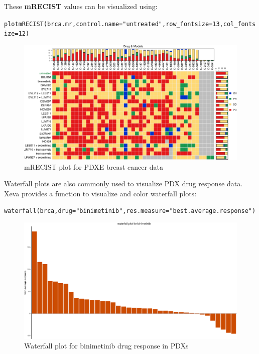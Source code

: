 \documentclass{article}\usepackage[]{graphicx}\usepackage[usenames,dvipsnames]{color}
\makeatletter
\def\maxwidth{ %
  \ifdim\Gin@nat@width>\linewidth
    \linewidth
  \else
    \Gin@nat@width
  \fi
}
\newcommand{\hlnum}[1]{\textcolor[rgb]{0.816,0.125,0.439}{#1}}%
\newcommand{\hlstr}[1]{\textcolor[rgb]{0.251,0.627,0.251}{#1}}%
\newcommand{\hlstd}[1]{\textcolor[rgb]{0.251,0.251,0.251}{#1}}%
\newcommand{\hlkwc}[1]{\textcolor[rgb]{0.251,0.251,0.251}{#1}}%
\newcommand{\hlkwd}[1]{\textcolor[rgb]{0.878,0.439,0.125}{#1}}%
\newenvironment{knitrout}{}{} %
\makeatother
\begin{document}
These \textbf{mRECIST} values can be visualized using:
\begin{knitrout}
\color{fgcolor}\begin{kframe}
\begin{alltt}
\hlkwd{plotmRECIST}\hlstd{(brca.mr,} \hlkwc{control.name}\hlstd{=}\hlstr{"untreated"}\hlstd{,} \hlkwc{row_fontsize}\hlstd{=}\hlnum{13}\hlstd{,} \hlkwc{col_fontsize}\hlstd{=}\hlnum{12}\hlstd{)}
\end{alltt}
\end{kframe}\begin{figure}
\includegraphics[width=\maxwidth]{figure/mR_BRCA-1} \caption{mRECIST plot for PDXE breast cancer data}\label{fig:mR_BRCA}
\end{figure}

\end{knitrout}


Waterfall plots are also commonly used to visualize PDX drug response data.
Xeva provides a function to visualize and color waterfall plots:
\begin{knitrout}
\color{fgcolor}\begin{kframe}
\begin{alltt}
\hlkwd{waterfall}\hlstd{(brca,} \hlkwc{drug}\hlstd{=}\hlstr{"binimetinib"}\hlstd{,} \hlkwc{res.measure}\hlstd{=}\hlstr{"best.average.response"}\hlstd{)}
\end{alltt}
\end{kframe}\begin{figure}
\includegraphics[width=\maxwidth]{figure/waterFall1-1} \caption{Waterfall plot for binimetinib drug response in PDXs}\label{fig:waterFall1}
\end{figure}

\end{knitrout}
\end{document}
